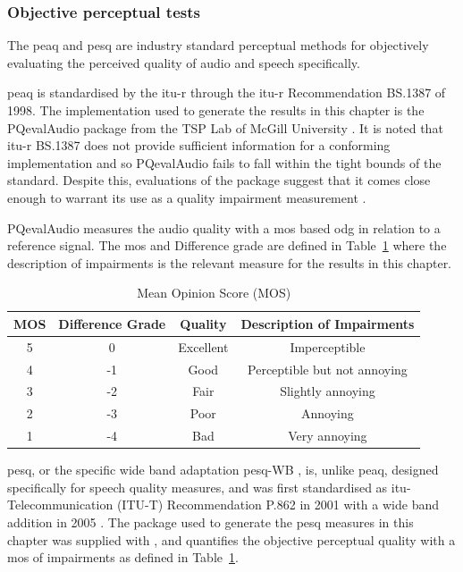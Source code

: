 \subsubsection{Objective perceptual tests}
The \gls{peaq} and \gls{pesq} are industry standard perceptual methods for objectively evaluating the perceived quality of audio and speech specifically.

\gls{peaq} is standardised by the \gls{itu-r} through the \gls{itu-r} Recommendation BS.1387 \cite{BS-1387-1998} of 1998. The implementation used to generate the results in this chapter is the PQevalAudio package from the TSP Lab of McGill University \cite{Kabal2003}. It is noted that \gls{itu-r} BS.1387 does not provide sufficient information for a conforming implementation \cite{Campeanu2005} and so PQevalAudio fails to fall within the tight bounds of the standard. Despite this, evaluations of the package suggest that it comes close enough to warrant its use as a quality impairment measurement \cite{Kabal2003}.

PQevalAudio measures the audio quality with a \gls{mos} based \gls{odg} in relation to a reference signal. The \gls{mos} \cite{P-800-1996} and Difference grade \cite{Kabal2003} are defined in Table~\ref{tab:MOS} where the description of impairments is the relevant measure for the results in this chapter.

\begin{table}\begin{center}
\caption{Mean Opinion Score (MOS)}
\label{tab:MOS}
\begin{tabular}{|c|c|c|c|}\hline
MOS & Difference Grade  & Quality       & Description of Impairments  \\ \hline
5   & 0                 & Excellent     & Imperceptible               \\
4   & -1                & Good          & Perceptible but not annoying\\
3   & -2                & Fair          & Slightly annoying           \\
2   & -3                & Poor          & Annoying                    \\
1   & -4                & Bad           & Very annoying               \\ \hline
\end{tabular}\end{center}\end{table}

\gls{pesq}, or the specific wide band adaptation \gls{pesq}-WB \cite{P862-2-2005}, is, unlike \gls{peaq}, designed specifically for speech quality measures, and was first standardised as \gls{itu}-Telecommunication (ITU-T) Recommendation P.862 in 2001 with a wide band addition in 2005 \cite{P862-2-2005}. The package used to generate the \gls{pesq} measures in this chapter was supplied with \cite{Loizou2007}, and quantifies the objective perceptual quality with a \gls{mos} of impairments as defined in Table~\ref{tab:MOS}.

